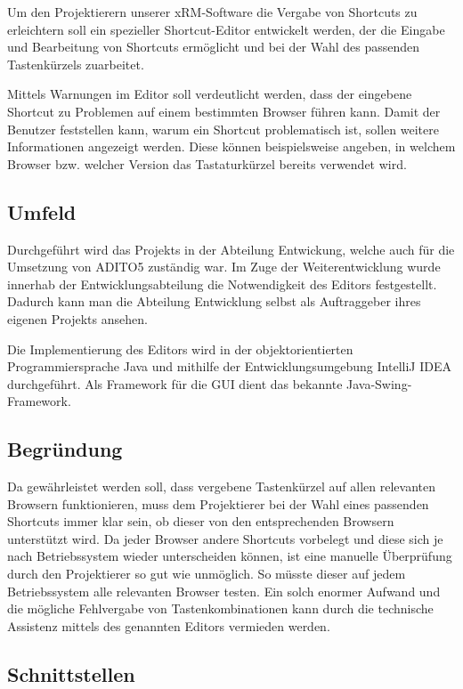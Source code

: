 Um den Projektierern unserer xRM-Software die Vergabe von Shortcuts zu erleichtern soll ein spezieller Shortcut-Editor entwickelt werden, der die Eingabe und Bearbeitung von Shortcuts ermöglicht und bei der Wahl des passenden Tastenkürzels zuarbeitet.

Mittels Warnungen im Editor soll verdeutlicht werden, dass der eingebene Shortcut zu Problemen auf einem bestimmten Browser führen kann.
Damit der Benutzer feststellen kann, warum ein Shortcut problematisch ist, sollen weitere Informationen angezeigt werden. Diese können beispielsweise angeben, in welchem Browser bzw. welcher Version das Tastaturkürzel bereits verwendet wird.

\subsection{Umfeld}

Durchgeführt wird das Projekts in der Abteilung Entwickung, welche auch für die Umsetzung von ADITO5 zuständig war. Im Zuge der Weiterentwicklung wurde innerhab der Entwicklungsabteilung die Notwendigkeit des Editors festgestellt. Dadurch kann man die Abteilung Entwicklung selbst als Auftraggeber ihres eigenen Projekts ansehen.

Die Implementierung des Editors wird in der objektorientierten Programmiersprache Java und mithilfe der Entwicklungsumgebung IntelliJ IDEA durchgeführt. Als Framework für die GUI dient das bekannte Java-Swing-Framework.

\subsection{Begründung}

Da gewährleistet werden soll, dass vergebene Tastenkürzel auf allen relevanten Browsern funktionieren, muss dem Projektierer bei der Wahl eines passenden Shortcuts immer klar sein, ob dieser von den entsprechenden Browsern unterstützt wird. Da jeder Browser andere Shortcuts vorbelegt und diese sich je nach Betriebssystem wieder unterscheiden können, ist eine manuelle Überprüfung durch den Projektierer so gut wie unmöglich. So müsste dieser auf jedem Betriebssystem alle relevanten Browser testen. Ein solch enormer Aufwand und die mögliche Fehlvergabe von Tastenkombinationen kann durch die technische Assistenz mittels des genannten Editors vermieden werden.

\subsection{Schnittstellen}
\label{schnittstellen} 

